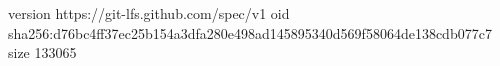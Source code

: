 version https://git-lfs.github.com/spec/v1
oid sha256:d76bc4ff37ec25b154a3dfa280e498ad145895340d569f58064de138cdb077c7
size 133065

